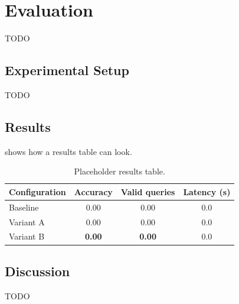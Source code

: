 \chapter{Evaluation}\label{ch:evaluation}

TODO

\section{Experimental Setup}\label{sec:eval_setup}

TODO

\section{Results}\label{sec:eval_results}

 shows how a results table can look.

\begin{table}[H]
  \centering
  \begin{tabular}{@{}lccc@{}}
    \toprule
    \textbf{Configuration} & \textbf{Accuracy} & \textbf{Valid queries} & \textbf{Latency (s)} \\
    \midrule
    Baseline   & 0.00 & 0.00 & 0.0 \\
    Variant A  & 0.00 & 0.00 & 0.0 \\
    Variant B  & \textbf{0.00} & \textbf{0.00} & 0.0 \\
    \bottomrule
  \end{tabular}
  \caption{Placeholder results table.}
  \label{tab:results-example}
\end{table}

\section{Discussion}\label{sec:eval_discussion}

TODO
